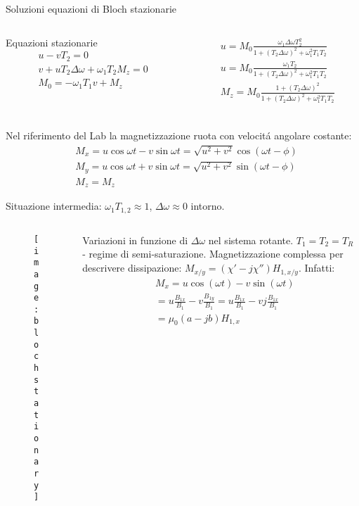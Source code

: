\begin{frame}{Soluzioni equazioni di Bloch stazionarie}
\begin{columns}[T]
\begin{column}{0.5\textwidth}
\begin{block}{Equazioni stazionarie}
\begin{align*}
&u-vT_2=0\\
&v+uT_2\Delta\omega+\omega_1T_2M_z=0\\
&M_0=-\omega_1T_1v+M_z
\end{align*}
\end{block}
\end{column}
\begin{column}{0.5\textwidth}
\begin{align*}
    &u=M_0\frac{\omega_1\Delta\omega T_2^2}{1+(T_2\Delta\omega)^2+\omega_1^2T_1T_2}\\
    &u=M_0\frac{\omega_1T_2}{1+(T_2\Delta\omega)^2+\omega_1^2T_1T_2}\\
    &M_z=M_0\frac{1+(T_2\Delta\omega)^2}{1+(T_2\Delta\omega)^2+\omega_1^2T_1T_2}\\
    \end{align*}
\end{column}
\end{columns}
    Nel riferimento del Lab la magnetizzazione ruota con velocit\'a angolare costante:
    \begin{align*}
    &M_x=u\cos{\omega t}-v\sin{\omega t}=\sqrt{u^2+v^2}\cos{(\omega t-\phi)}\\
    &M_y=u\cos{\omega t}+v\sin{\omega t}=\sqrt{u^2+v^2}\sin{(\omega t-\phi)}\\
    &M_z=M_z
\end{align*}
\end{frame}

\begin{frame}{Situazione intermedia: $\omega_1T_{1,2}\approx1$, $\Delta\omega\approx0$ intorno.}
\begin{columns}[T]
\begin{column}{0.5\textwidth}
\begin{figure}
    \centering
    \texttt{[image: blochstationary]}
    \label{fig:blochstationary}
\end{figure}
\end{column}
\begin{column}{0.5\textwidth}
Variazioni in funzione di $\Delta\omega$ nel sistema rotante. $T_1=T_2=T_R$ - regime di semi-saturazione.
Magnetizzazione complessa per descrivere dissipazione: $M_{x/y}=(\chi'-j\chi'')H_{1,x/y}$. Infatti:
\begin{align*}
&M_x=u\cos{(\omega t)}-v\sin{(\omega t)}\\
&=u\frac{B_{1x}}{B_1}-v\frac{B_{1y}}{B_1}=u\frac{B_{1x}}{B_1}-vj\frac{B_{1x}}{B_1}\\
&=\mu_0(a-jb)H_{1,x}
\end{align*}
\end{column}
\end{columns}
\end{frame}

